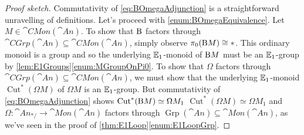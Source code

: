 \begin{proof}[Proof sketch]
	Commutativity of \cref{eq:BOmegaAdjunction} is a straightforward unravelling of definitions. Let's proceed with \cref{enum:BOmegaEquivalence}. Let $M\in \cat{CMon}(\cat{An})$. To show that $\mathrm{B}$ factors through $\cat{CGrp}(\cat{An})\subseteq \cat{CMon}(\cat{An})$, simply observe $\pi_0(\mathrm{B} M)\cong *$. This ordinary monoid is a group and so the underlying $\mathbb{E}_1$-monoid of $\mathrm{B} M$ must be an $\mathbb{E}_1$-group by \cref{lem:E1Groups}\cref{enum:MGroupOnPi0}. To show that $\Omega$ factors through $\cat{CGrp}(\cat{An})\subseteq \cat{CMon}(\cat{An})$, we must show that the underlying $\mathbb{E}_1$-monoid $\operatorname{Cut}^*(\Omega M)$ of $\Omega M$ is an $\mathbb{E}_1$-group. But commutativity of \cref{eq:BOmegaAdjunction} shows $\operatorname{Cut}^*(\mathrm{B} M)\simeq \Omega M_1$  $\operatorname{Cut}^*(\Omega M)\simeq \Omega M_1$ and $\Omega\colon \cat{An}_{*/}\rightarrow \cat{Mon}(\cat{An})$ factors through $\operatorname{Grp}(\cat{An})\subseteq \cat{Mon}(\cat{An})$, as we've seen in the proof of \cref{thm:E1Loop}\cref{enum:E1LoopGrp}.
	

\end{proof}
